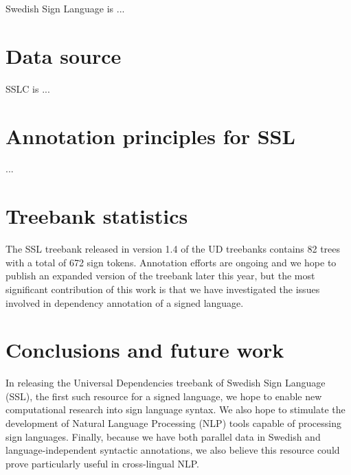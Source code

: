 \documentclass[11pt]{article}
\begin{document}
Swedish Sign Language is ...

\section{Data source}

SSLC is ...

\section{Annotation principles for SSL}

...

\section{Treebank statistics}

The SSL treebank released in version 1.4 of the UD treebanks
contains 82 trees with a total of 672 sign tokens.
Annotation efforts are ongoing and we hope to publish an expanded version
of the treebank later this year, but the most significant contribution of
this work is that we have investigated the issues involved in dependency
annotation of a signed language.


\section{Conclusions and future work}

In releasing the Universal Dependencies treebank of Swedish Sign Language
(SSL), the first such resource for a signed language,
we hope to enable new computational research into sign language syntax.
We also hope to stimulate the development of Natural
Language Processing (NLP) tools capable of processing sign languages.
Finally, because we have both parallel data in Swedish and language-independent
syntactic annotations, we also believe this resource could prove particularly
useful in cross-lingual NLP.


%



\end{document}
